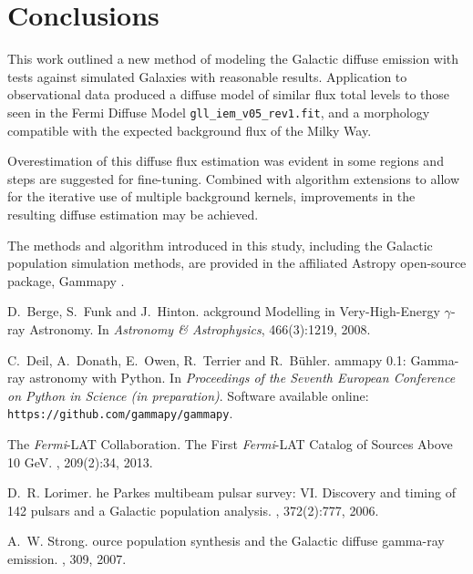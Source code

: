 \documentclass{PoS}
\begin{document}
\section{Conclusions}

This work outlined a new method of modeling the Galactic diffuse emission with tests against simulated Galaxies with reasonable results. Application to observational data produced a diffuse model of similar flux total levels to those seen in the Fermi Diffuse Model \verb|gll_iem_v05_rev1.fit|, and a morphology compatible with the expected background flux of the Milky Way.

Overestimation of this diffuse flux estimation was evident in some regions and steps are suggested for fine-tuning. Combined with algorithm extensions to allow for the iterative use of multiple background kernels, improvements in the resulting diffuse estimation may be achieved.

The methods and algorithm introduced in this study, including the Galactic population simulation methods, are provided in the affiliated Astropy open-source package, Gammapy \cite{Deil}.

\begin{thebibliography}{99}

D.~Berge, S.~Funk and J.~Hinton.
ackground {M}odelling in {V}ery-{H}igh-{E}nergy $\gamma$-ray {A}stronomy.
\newblock In {\em {A}stronomy \& {A}strophysics}, 466(3):1219, 2008.

C.~Deil, A.~Donath, E.~Owen, R.~Terrier and R.~B{\"{u}}hler.
ammapy {0.1}: {G}amma-ray astronomy with {P}ython.
\newblock In {\em {P}roceedings of the {S}eventh {E}uropean {C}onference on
  {P}ython in {S}cience (in preparation)}.
\newblock Software available online: {\verb|https://github.com/gammapy/gammapy|}.

{The \textit{Fermi}-LAT Collaboration}.
\newblock The {F}irst {\textit{Fermi}-LAT} {C}atalog of {S}ources {A}bove 10 {GeV}.
, 209(2):34, 2013.

D.~R. Lorimer.
he {P}arkes multibeam pulsar survey: {VI.} {D}iscovery and timing
  of 142 pulsars and a {G}alactic population analysis.
, 372(2):777,
  2006.

A.~W. Strong.
ource population synthesis and the {G}alactic diffuse gamma-ray
  emission.
, 309, 2007.


\end{thebibliography}
\end{document}
